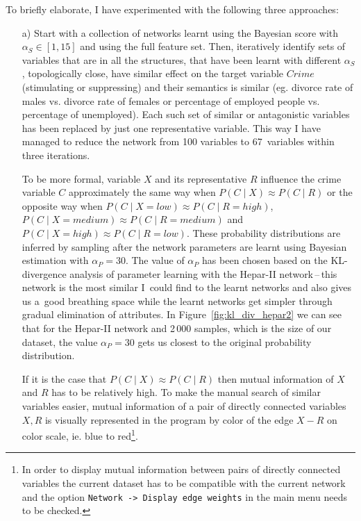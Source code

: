 \documentclass[english,cover]{fitthesis} %
\newcommand{\srccode}[1]{{\tt #1}}         %
\begin{document}
To briefly elaborate, I have experimented with the following three approaches:
\begin{enumerate}
    \item[a)] Start with a collection of networks learnt using the Bayesian score with $\alpha_S \in [1, 15]$ and using the full feature set. Then, iteratively identify sets of variables that are in all the structures, that have been learnt with different $\alpha_S$, topologically close, have similar effect on the target variable $Crime$ (stimulating or suppressing) and their semantics is similar (eg. divorce rate of males vs. divorce rate of females or percen\-tage of employed people vs. percentage of unemployed). Each such set of similar or antagonistic variables has been replaced by just one representative variable. This way I have managed to reduce the network from 100 variables to 67~variables within three iterations.
    
     To be more formal, variable $X$ and its representative $R$ influence the crime variable $C$ approximately the same way when $P(C \mid X) \approx P(C \mid R)$ or the opposite way when $P(C \mid X = low) \approx P(C \mid R = high)$, $P(C \mid X = medium) \approx P(C \mid R = medium)$ and $P(C \mid X = high) \approx P(C \mid R = low)$.
    These probability distributions are inferred by sampling after the network parameters are learnt using Bayesian estimation with $\alpha_P = 30$. The value of $\alpha_P$ has been chosen based on the KL-divergence analysis of parameter learning with the Hepar-II network\,--\,this network is the most similar I~could find to the learnt networks and also gives us a~good breathing space while the learnt networks get simpler through gradual elimination of attributes. In Figure~\ref{fig:kl_div_hepar2} we can see that for the Hepar-II network and 2\,000 samples, which is the size of our dataset, the value $\alpha_P = 30$ gets us closest to the original probability distribution.
    
    If it is the case that $P(C \mid X) \approx P(C \mid R)$ then mutual information of $X$ and $R$ has to be relatively high. To make the manual search of similar variables easier, mutual information of a pair of directly connected variables $X,R$ is visually represented in the program by color of the edge $X - R$ on  color scale, ie. blue to red\footnote{In order to display mutual information between pairs of directly connected variables the current dataset has to be compatible with the current network and the option \srccode{Network -> Display edge weights} in the main menu needs to be checked.}.
    

\end{enumerate}
\end{document}
